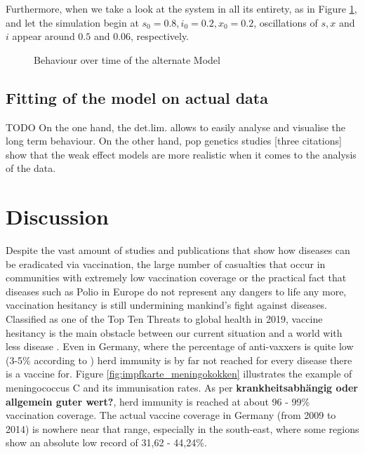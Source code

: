 \documentclass[12pt,a4paper,twoside]{article}
\begin{document}
\newpage

Furthermore, when we take a look at the system in all its entirety, as in Figure \ref{fig:time_behaviour_my_model}, and let the simulation begin at $s_0 = 0.8, i_0 = 0.2, x_0 = 0.2$, oscillations of $s, x$ and $i$ appear around $0.5$ and $0.06$, respectively.

\begin{figure}[h!]
	\centering
	\caption{Behaviour over time of the alternate Model}
	\label{fig:time_behaviour_my_model}
	\def\svgwidth{350pt}
	
\end{figure}


\newpage

\subsection{Fitting of the model on actual data}
TODO
On the one hand, the det.lim. allows to easily analyse and visualise the long term behaviour. On the other hand, pop genetics studies [three citations] show that the weak effect models are more realistic when it comes to the analysis of the data.

\section{Discussion}

Despite the vast amount of studies and publications that show how diseases can be eradicated via vaccination, the large number of casualties that occur in communities with extremely low vaccination coverage or the practical fact that diseases such as Polio in Europe do not represent any dangers to life any more, vaccination hesitancy is still undermining mankind's fight against diseases. Classified as one of the Top Ten Threats to global health in 2019, vaccine hesitancy is the main obstacle between our current situation and a world with less disease \cite{WHOAkbar2019}. Even in Germany, where the percentage of anti-vaxxers is quite low (3-5\% according to \cite{Meyer2004}) herd immunity is by far not reached for every disease there is a vaccine for. Figure \ref{fig:impfkarte_meningokokken} illustrates the example of meningococcus C and its immunisation rates. As per \textbf{krankheitsabhängig oder allgemein guter wert?}, herd immunity is reached at about 96 - 99\% vaccination coverage. The actual vaccine coverage in Germany (from 2009 to 2014) is nowhere near that range, especially in the south-east, where some regions show an absolute low record of 31,62 - 44,24\%.
\end{document}
